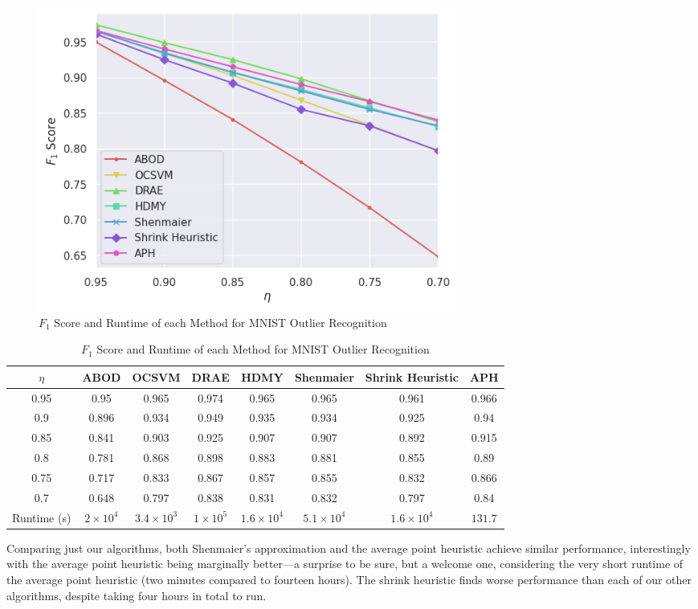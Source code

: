 \documentclass[11pt,twoside]{report}
\theoremstyle{definition}
\numberwithin{theorem}{section}
\numberwithin{definition}{section}
\numberwithin{lemma}{section}
\numberwithin{proposition}{section}
\numberwithin{equation}{section}
\numberwithin{figure}{section}
\begin{document}
\begin{figure}[ht]
    \centering
    \includegraphics[width=0.6666\textwidth]{images/mnist_plot.png}
    \caption{$F_1$ Score and Runtime of each Method for MNIST Outlier Recognition}
    \label{fig:mnist_fig}
\end{figure}
\begin{table}[ht]
    \centering
    \begin{tabular}{|c||c|c|c|c||c|c|c|} \hline
        $\eta$&ABOD&OCSVM&DRAE&HDMY&Shenmaier&Shrink Heuristic&APH \\ \hline
        0.95&0.95&0.965&0.974&0.965&0.965&0.961&0.966 \\
        0.9&0.896&0.934&0.949&0.935&0.934&0.925&0.94 \\
        0.85&0.841&0.903&0.925&0.907&0.907&0.892&0.915 \\
        0.8&0.781&0.868&0.898&0.883&0.881&0.855&0.89 \\
        0.75&0.717&0.833&0.867&0.857&0.855&0.832&0.866 \\
        0.7&0.648&0.797&0.838&0.831&0.832&0.797&0.84 \\ \hline
        Runtime (s) & $2\times10^4$ & $3.4\times10^3$ & $1\times10^5$ & $1.6\times10^4$ & $5.1\times10^4$ & $1.6\times10^4$ & $131.7$ \\ \hline
    \end{tabular}
    \caption{$F_1$ Score and Runtime of each Method for MNIST Outlier Recognition}
    \label{tab:mnist_table}
\end{table}

Comparing just our algorithms, both Shenmaier's approximation and the average point heuristic achieve similar performance, interestingly with the average point heuristic being marginally better---a surprise to be sure, but a welcome one, considering the very short runtime of the average point heuristic (two minutes compared to fourteen hours). The shrink heuristic finds worse performance than each of our other algorithms, despite taking four hours in total to run.
\end{document}
